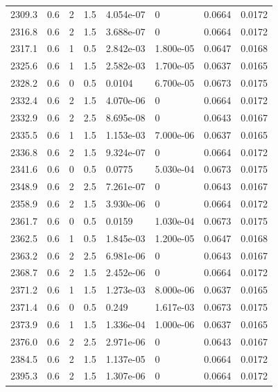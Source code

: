 \documentclass[preview]{standalone}
\begin{document}
{{{{{{\begin{tabular}{L{1.2cm}C{1.2cm} C{0.3cm}C{0.5cm} C{1.4cm}C{1.4cm} C{1.4cm}C{1.4cm}}
  2309.3  &   0.6  & 2     & 1.5 &  4.054e-07  & 0  & 0.0664 &  0.0172   \\ 
  2316.8  &   0.6  & 2     & 1.5 &  3.688e-07  & 0  & 0.0664 &  0.0172   \\ 
  2317.1  &   0.6  & 1     & 0.5 &  2.842e-03  & 1.800e-05  & 0.0647 &  0.0168   \\ 
  2325.6  &   0.6  & 1     & 1.5 &  2.582e-03  & 1.700e-05  & 0.0637 &  0.0165   \\ 
  2328.2  &   0.6  & 0     & 0.5 &  0.0104  & 6.700e-05  & 0.0673 &  0.0175   \\ 
  2332.4  &   0.6  & 2     & 1.5 &  4.070e-06  & 0  & 0.0664 &  0.0172   \\ 
  2332.9  &   0.6  & 2     & 2.5 &  8.695e-08  & 0  & 0.0643 &  0.0167   \\ 
  2335.5  &   0.6  & 1     & 1.5 &  1.153e-03  & 7.000e-06  & 0.0637 &  0.0165   \\ 
  2336.8  &   0.6  & 2     & 1.5 &  9.324e-07  & 0  & 0.0664 &  0.0172   \\ 
  2341.6  &   0.6  & 0     & 0.5 &  0.0775  & 5.030e-04  & 0.0673 &  0.0175   \\ 
  2348.9  &   0.6  & 2     & 2.5 &  7.261e-07  & 0  & 0.0643 &  0.0167   \\ 
  2358.9  &   0.6  & 2     & 1.5 &  3.930e-06  & 0  & 0.0664 &  0.0172   \\ 
  2361.7  &   0.6  & 0     & 0.5 &  0.0159  & 1.030e-04  & 0.0673 &  0.0175   \\ 
  2362.5  &   0.6  & 1     & 0.5 &  1.845e-03  & 1.200e-05  & 0.0647 &  0.0168   \\ 
  2363.2  &   0.6  & 2     & 2.5 &  6.981e-06  & 0  & 0.0643 &  0.0167   \\ 
  2368.7  &   0.6  & 2     & 1.5 &  2.452e-06  & 0  & 0.0664 &  0.0172   \\ 
  2371.2  &   0.6  & 1     & 1.5 &  1.273e-03  & 8.000e-06  & 0.0637 &  0.0165   \\ 
  2371.4  &   0.6  & 0     & 0.5 &  0.249  & 1.617e-03  & 0.0673 &  0.0175   \\ 
  2373.9  &   0.6  & 1     & 1.5 &  1.336e-04  & 1.000e-06  & 0.0637 &  0.0165   \\ 
  2376.0  &   0.6  & 2     & 2.5 &  2.971e-06  & 0  & 0.0643 &  0.0167   \\ 
  2384.5  &   0.6  & 2     & 1.5 &  1.137e-05  & 0  & 0.0664 &  0.0172   \\ 
  2395.3  &   0.6  & 2     & 1.5 &  1.307e-06  & 0  & 0.0664 &  0.0172   \\ 

\end{tabular}}}}}}}
\end{document}
